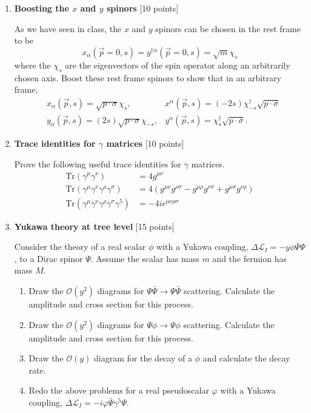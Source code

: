 \documentclass[12pt]{article}
\begin{document}
\begin{enumerate}

\item {\bf Boosting the $x$ and $y$ spinors} [10 points]

As we have seen in class, the $x$ and $y$ spinors can be chosen in the rest frame to be 
\[ x_\alpha (\vec{p}=0,s)=y^{\dagger\dot\alpha} (\vec{p}=0,s)=\sqrt{m} \chi_s \]
where the $\chi_s$ are the eigenvectors of the spin operator along an arbitrarily chosen axis.
Boost these rest frame spinors to show that in an arbitrary frame,
\begin{eqnarray}
& x_\alpha (\vec{p},s)= \sqrt{p\cdot \sigma} \chi_s , \ \ \ & x^\alpha (\vec{p},s)=(-2s) \chi_{-s}^\dagger   \sqrt{p\cdot \bar\sigma}  \nonumber \\
& y_\alpha (\vec{p},s)= (2s) \sqrt{p\cdot \sigma} \chi_{-s} ,  & y^\alpha (\vec{p},s)= \chi_s^\dagger  \sqrt{p\cdot \bar\sigma}.  \nonumber 
\end{eqnarray}


\item {\bf Trace identities for $\gamma$ matrices} [10 points]

Prove the following useful trace identities for $\gamma$ matrices.
\begin{align}
	\text{Tr} (\gamma^\mu\gamma^\nu) & = 4 g^{\mu\nu}\\
	\text{Tr} (\gamma^\mu\gamma^\nu\gamma^\rho\gamma^\sigma) & = 4 (g^{\mu\nu}g^{\rho\sigma} - g^{\mu\rho}g^{\nu\sigma}+g^{\mu\sigma}g^{\nu\rho})\\
	\text{Tr} (\gamma^\mu\gamma^\nu\gamma^\rho\gamma^\sigma\gamma^5) & = -4i\epsilon^{\mu\nu\rho\sigma}
\end{align}

\item {\bf Yukawa theory at tree level} [15 points]

Consider the theory of a real scalar $\phi$ with a Yukawa coupling, $\Delta \mathcal L_I = -y\phi\bar\Psi \Psi$, to a Dirac spinor $\Psi$. Assume the scalar has mass $m$ and the fermion has mass $M$.

\begin{enumerate}
	\item Draw the $\mathcal O(y^2)$ diagrams for $\Psi\bar\Psi\to \Psi\bar\Psi$ scattering. Calculate the amplitude and cross section for this process.
	\item Draw the $\mathcal O(y^2)$ diagrams for $\Psi\phi \to \Psi\phi$ scattering. Calculate the amplitude and cross section for this process.
	\item Draw the $\mathcal O(y)$ diagram for the decay of a $\phi$ and calculate the decay rate.
	\item Redo the above problems for a real pseudoscalar $\varphi$ with a Yukawa coupling, $\Delta \mathcal L_I = -i\varphi\bar\Psi\gamma^5 \Psi$.
\end{enumerate}


\end{enumerate}
\end{document}
